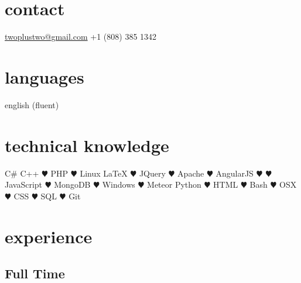 \documentclass[]{friggeri-cv} %
\begin{document}


\begin{aside} %
\section{contact}
\href{mailto:twoplustwo@gmail.com}{twoplustwo@gmail.com}
+1 (808) 385 1342
\section{languages}
english (fluent)
\section{technical knowledge}
C\#
C++
{\color{red} $\varheartsuit$} PHP
{\color{red} $\varheartsuit$} Linux
LaTeX
{\color{red} $\varheartsuit$} JQuery
{\color{red} $\varheartsuit$} Apache
{\color{red} $\varheartsuit$} AngularJS
{\color{red} $\varheartsuit$}{\color{red} $\varheartsuit$} JavaScript
{\color{red} $\varheartsuit$} MongoDB
{\color{red} $\varheartsuit$} Windows
{\color{red} $\varheartsuit$} Meteor
Python
{\color{red} $\varheartsuit$} HTML
{\color{red} $\varheartsuit$} Bash
{\color{red} $\varheartsuit$} OSX
{\color{red} $\varheartsuit$} CSS
{\color{red} $\varheartsuit$} SQL
{\color{red} $\varheartsuit$} Git
\end{aside}



\section{experience}

\subsection{Full Time}
\end{document}
